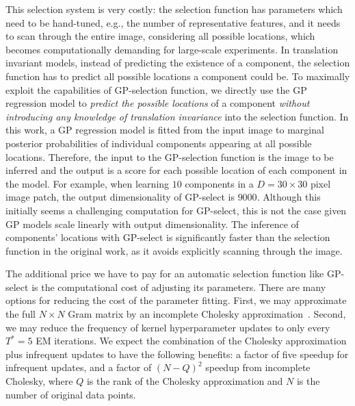 This selection system is very costly: the selection function has parameters which need to be hand-tuned, e.g., the number of representative features, and %
it needs to scan through the entire image, considering all possible locations, which becomes computationally demanding for large-scale experiments.
%
In translation invariant models, instead of predicting the existence of a component, the selection function has to predict all possible locations a component could be.
To maximally exploit the capabilities of GP-selection function, we directly use the GP regression model to \textit{predict the possible locations} of a component \textit{without introducing any knowledge of translation invariance} into the selection function. In this work, a GP regression model is fitted from the input image to marginal posterior probabilities of individual components appearing at all possible locations. Therefore, the input to the GP-selection function is the image to be inferred and the output is a score for each possible location of each component in the model.
For example, when learning $10$ components in a $D=30\times 30$ pixel image patch, the output dimensionality of GP-select is $9000$.
Although this initially seems a challenging computation for GP-select, this is not the case given GP models scale linearly with output dimensionality.
The inference of components' locations with GP-select is significantly faster than the selection function in the original work, as it avoids explicitly scanning through the image.

The additional price we have to pay for an automatic selection function like GP-select is the computational cost of adjusting its parameters. %
There are many options for reducing the cost of the parameter fitting. 
First, we may approximate the full $N \times N$ Gram matrix by an incomplete Cholesky approximation~\cite{FinSch01}.
%
Second, we may reduce the frequency of kernel hyperparameter updates to only every $T^*=5$ EM iterations.
We expect the combination of the Cholesky approximation plus infrequent updates to have the following benefits: a factor of five speedup for infrequent updates, and a factor of $(N-Q)^2$ speedup from incomplete Cholesky, where $Q$ is the rank of the Cholesky approximation and $N$ is the number of original data points. 

